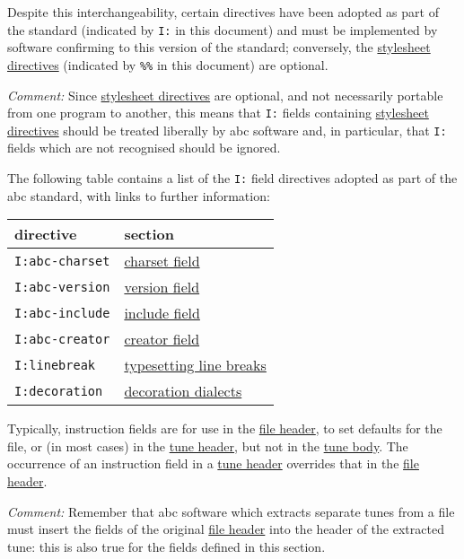 Despite this interchangeability, certain directives have been adopted as
part of the standard (indicated by \texttt{I:} in this document) and
must be implemented by software confirming to this version of the
standard; conversely, the
\protect\hyperlink{stylesheet_directive_definition}{stylesheet
directives} (indicated by \texttt{\%\%} in this document) are optional.

\emph{Comment:} Since
\protect\hyperlink{stylesheet_directive_definition}{stylesheet
directives} are optional, and not necessarily portable from one program
to another, this means that \texttt{I:} fields containing
\protect\hyperlink{stylesheet_directive_definition}{stylesheet
directives} should be treated liberally by abc software and, in
particular, that \texttt{I:} fields which are not recognised should be
ignored.

The following table contains a list of the \texttt{I:} field directives
adopted as part of the abc standard, with links to further information:

\begin{longtable}[]{@{}ll@{}}
\toprule
directive & section\tabularnewline
\midrule
\endhead
\texttt{I:abc-charset} & \protect\hyperlink{charset_field}{charset
field}\tabularnewline
\texttt{I:abc-version} & \protect\hyperlink{version_field}{version
field}\tabularnewline
\texttt{I:abc-include} & \protect\hyperlink{include_field}{include
field}\tabularnewline
\texttt{I:abc-creator} & \protect\hyperlink{creator_field}{creator
field}\tabularnewline
\texttt{I:linebreak} &
\protect\hyperlink{typesetting_line-breaks}{typesetting line
breaks}\tabularnewline
\texttt{I:decoration} &
\protect\hyperlink{decoration_dialects}{decoration
dialects}\tabularnewline
\bottomrule
\end{longtable}

Typically, instruction fields are for use in the
\protect\hyperlink{file_header_definition}{file header}, to set defaults
for the file, or (in most cases) in the
\protect\hyperlink{tune_header_definition}{tune header}, but not in the
\protect\hyperlink{tune_body_definition}{tune body}. The occurrence of
an instruction field in a
\protect\hyperlink{tune_header_definition}{tune header} overrides that
in the \protect\hyperlink{file_header_definition}{file header}.

\emph{Comment:} Remember that abc software which extracts separate tunes
from a file must insert the fields of the original
\protect\hyperlink{file_header_definition}{file header} into the header
of the extracted tune: this is also true for the fields defined in this
section.


